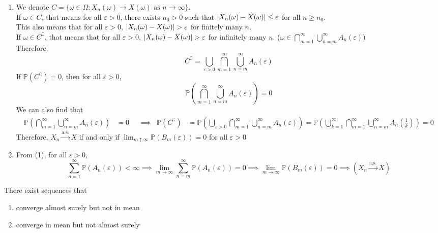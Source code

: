 \documentclass{huhtakm-template-book}
\newcommand{\prob}{\mathbb{P}}
\begin{document}
\begin{proofing}
	\begin{enumerate}
		\item We denote $C=\{\omega\in\Omega:X_{n}(\omega)\to X(\omega)\text{ as }n\to\infty\}$.\\
		If $\omega\in C$, that means for all $\varepsilon>0$, there exists $n_{0}>0$ such that $\left|{X_{n}(\omega)-X(\omega)}\right|\leq\varepsilon$ for all $n\geq n_{0}$.\\
		This also means that for all $\varepsilon>0$, $\abs{X_{n}(\omega)-X(\omega)}>\varepsilon$ for finitely many $n$.\\
		If $\omega\in C^{\complement}$, that means that for all $\varepsilon>0$, $\abs{X_{n}(\omega)-X(\omega)}>\varepsilon$ for infinitely many $n$. ($\omega\in\bigcap_{m=1}^{\infty}\bigcup_{n=m}^{\infty}A_{n}(\varepsilon)$)\\
		Therefore,
		\begin{equation*}
			C^{\complement}=\bigcup_{\varepsilon>0}\bigcap_{m=1}^{\infty}\bigcup_{n=m}^{\infty}A_{n}(\varepsilon)
		\end{equation*}
		If $\prob(C^{\complement})=0$, then for all $\varepsilon>0$,
		\begin{equation*}
			\prob\left(\bigcap_{m=1}^{\infty}\bigcup_{n=m}^{\infty}A_{n}(\varepsilon)\right)=0
		\end{equation*}
		We can also find that
		\begin{align*}
			\prob\left(\bigcap_{m=1}^{\infty}\bigcup_{n=m}^{\infty}A_{n}(\varepsilon)\right)&=0 & &\implies & \prob(C^{\complement})&=\prob\left(\bigcup_{\varepsilon>0}\bigcap_{m=1}^{\infty}\bigcup_{n=m}^{\infty}A_{n}(\varepsilon)\right)=\prob\left(\bigcup_{k=1}^{\infty}\bigcap_{m=1}^{\infty}\bigcup_{n=m}^{\infty}A_{n}\left(\frac{1}{k}\right)\right)=0
		\end{align*}
		Therefore, $X_{n}\xrightarrow{\text{a.s.}}X$ if and only if $\lim_{m\uparrow\infty}\prob(B_{m}(\varepsilon))=0$ for all $\varepsilon>0$
		\item From (1), for all $\varepsilon>0$,
		\begin{equation*}
			\sum_{n=1}^{\infty}\prob(A_{n}(\varepsilon))<\infty\implies\lim_{m\to\infty}\sum_{n=m}^{\infty}\prob(A_{n}(\varepsilon))=0\implies\lim_{m\to\infty}\prob(B_{m}(\varepsilon))=0\implies(X_{n}\xrightarrow{\text{a.s.}}X)
		\end{equation*}
	\end{enumerate}
\end{proofing}
\begin{lem}
	\label{Chapter 7 Lemma Non-relationship between almost surely convergence and mean}
	There exist sequences that
	\begin{enumerate}
		\item converge almost surely but not in mean
		\item converge in mean but not almost surely
	\end{enumerate}
\end{lem}
\end{document}
